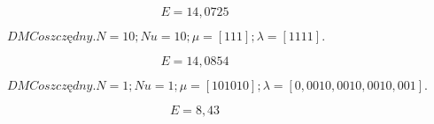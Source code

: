 \begin{equation}
    E = 14,0725
\end{equation}

\begin{figure}[H]
    \centering
    
    \caption{$DMC oszczędny. N = 10; Nu = 10; \mu = [1 1 1]; \lambda = [1 1 1 1].$}
\end{figure}

\begin{equation}
    E = 14,0854
\end{equation}

%     


%     



\begin{figure}[H]
    \centering
    
    \caption{$DMC oszczędny. N = 1; Nu = 1; \mu = [10 10 10]; \lambda = [0,001 0,001 0,001 0,001].$}
\end{figure}

\begin{equation}
    E = 8,43
\end{equation}

%     

